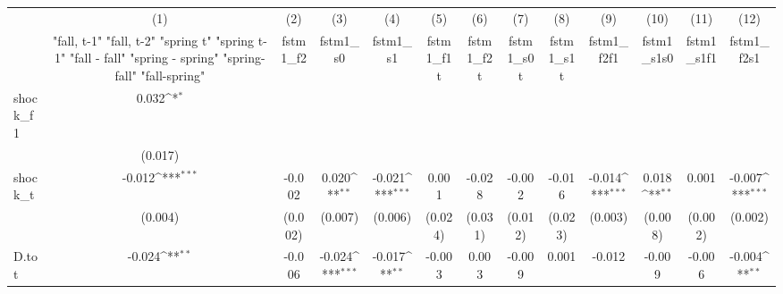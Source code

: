 {
\def\sym#1{\ifmmode^{#1}\else\(^{#1}\)\fi}
\begin{tabular}{l*{12}{c}}
\toprule
            &\multicolumn{1}{c}{(1)}&\multicolumn{1}{c}{(2)}&\multicolumn{1}{c}{(3)}&\multicolumn{1}{c}{(4)}&\multicolumn{1}{c}{(5)}&\multicolumn{1}{c}{(6)}&\multicolumn{1}{c}{(7)}&\multicolumn{1}{c}{(8)}&\multicolumn{1}{c}{(9)}&\multicolumn{1}{c}{(10)}&\multicolumn{1}{c}{(11)}&\multicolumn{1}{c}{(12)}\\
            &\multicolumn{1}{c}{  "fall, t-1" "fall, t-2" "spring t" "spring t-1"  "fall - fall" "spring - spring" "spring-fall" "fall-spring" }&\multicolumn{1}{c}{fstm1\_f2}&\multicolumn{1}{c}{fstm1\_s0}&\multicolumn{1}{c}{fstm1\_s1}&\multicolumn{1}{c}{fstm1\_f1t}&\multicolumn{1}{c}{fstm1\_f2t}&\multicolumn{1}{c}{fstm1\_s0t}&\multicolumn{1}{c}{fstm1\_s1t}&\multicolumn{1}{c}{fstm1\_f2f1}&\multicolumn{1}{c}{fstm1\_s1s0}&\multicolumn{1}{c}{fstm1\_s1f1}&\multicolumn{1}{c}{fstm1\_f2s1}\\
\midrule
shock\_f1    &       0.032\sym{*}  &                     &                     &                     &                     &                     &                     &                     &                     &                     &                     &                     \\
            &     (0.017)         &                     &                     &                     &                     &                     &                     &                     &                     &                     &                     &                     \\
\addlinespace
shock\_t     &      -0.012\sym{***}&      -0.002         &       0.020\sym{**} &      -0.021\sym{***}&       0.001         &      -0.028         &      -0.002         &      -0.016         &      -0.014\sym{***}&       0.018\sym{**} &       0.001         &      -0.007\sym{***}\\
            &     (0.004)         &     (0.002)         &     (0.007)         &     (0.006)         &     (0.024)         &     (0.031)         &     (0.012)         &     (0.023)         &     (0.003)         &     (0.008)         &     (0.002)         &     (0.002)         \\
\addlinespace
D.tot       &      -0.024\sym{**} &      -0.006         &      -0.024\sym{***}&      -0.017\sym{**} &      -0.003         &       0.003         &      -0.009         &       0.001         &      -0.012         &      -0.009         &      -0.006         &      -0.004\sym{**} \\

\end{tabular}}
